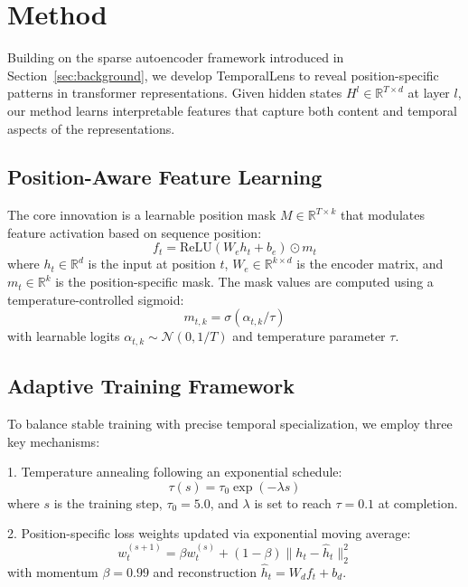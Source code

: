 \documentclass{article} %
\begin{document}
\section{Method}
\label{sec:method}

Building on the sparse autoencoder framework introduced in Section~\ref{sec:background}, we develop TemporalLens to reveal position-specific patterns in transformer representations. Given hidden states $H^l \in \mathbb{R}^{T \times d}$ at layer $l$, our method learns interpretable features that capture both content and temporal aspects of the representations.

\subsection{Position-Aware Feature Learning}

The core innovation is a learnable position mask $M \in \mathbb{R}^{T \times k}$ that modulates feature activation based on sequence position:
\begin{equation}
    f_t = \text{ReLU}(W_e h_t + b_e) \odot m_t
\end{equation}
where $h_t \in \mathbb{R}^d$ is the input at position $t$, $W_e \in \mathbb{R}^{k \times d}$ is the encoder matrix, and $m_t \in \mathbb{R}^k$ is the position-specific mask. The mask values are computed using a temperature-controlled sigmoid:
\begin{equation}
    m_{t,k} = \sigma(\alpha_{t,k}/\tau)
\end{equation}
with learnable logits $\alpha_{t,k} \sim \mathcal{N}(0, 1/T)$ and temperature parameter $\tau$.

\subsection{Adaptive Training Framework}

To balance stable training with precise temporal specialization, we employ three key mechanisms:

1. Temperature annealing following an exponential schedule:
\begin{equation}
    \tau(s) = \tau_0 \exp(-\lambda s)
\end{equation}
where $s$ is the training step, $\tau_0=5.0$, and $\lambda$ is set to reach $\tau=0.1$ at completion.

2. Position-specific loss weights updated via exponential moving average:
\begin{equation}
    w_t^{(s+1)} = \beta w_t^{(s)} + (1-\beta)\|h_t - \hat{h}_t\|_2^2
\end{equation}
with momentum $\beta=0.99$ and reconstruction $\hat{h}_t = W_d f_t + b_d$.
\end{document}
